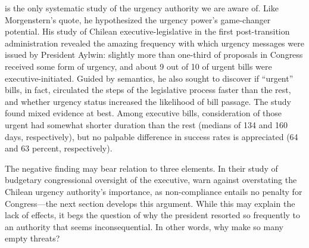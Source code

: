 \documentclass[letter,12pt]{article}
\begin{document}

\citet{siavelis.2002} is the only systematic study of the urgency authority we are aware of. Like Morgenstern's quote, he hypothesized the urgency power's game-changer potential. His study of Chilean executive-legislative in the first post-transition administration revealed the amazing frequency with which urgency messages were issued by President Aylwin: slightly more than one-third of proposals in Congress received some form of urgency, and about 9 out of 10 of urgent bills were executive-initiated. Guided by semantics, he also sought to discover if ``urgent'' bills, in fact, circulated the steps of the legislative process faster than the rest, and whether urgency status increased the likelihood of bill passage. The study found mixed evidence at best. Among executive bills, consideration of those urgent had somewhat shorter duration than the rest (medians of 134 and 160 days, respectively), but no palpable difference in success rates is appreciated (64 and 63 percent, respectively). 

The negative finding may bear relation to three elements. In their study of budgetary congressional oversight of the executive, \citet{berrios.gamboa.fiscChile.2006} warn against overstating the Chilean urgency authority's importance, as non-compliance entails no penalty for Congress---the next section develops this argument. While this may explain the lack of effects, it begs the question of why the president resorted so frequently to an authority that seems inconsequential. In other words, why make so many empty threats?
\end{document}
